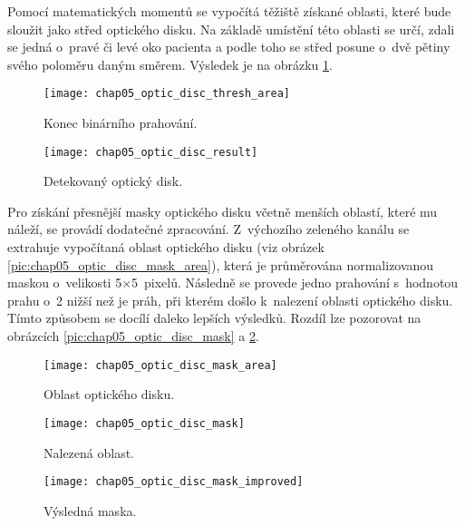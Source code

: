 Pomocí matematických momentů se vypočítá těžiště získané oblasti, které bude sloužit jako střed optického disku. Na základě umístění této oblasti se určí, zdali se jedná o~pravé či levé oko pacienta a podle toho se střed posune o~dvě pětiny svého poloměru daným směrem. Výsledek je na obrázku \ref{pic:chap05_optic_disc_result}.

\begin{figure}[h]
  \begin{minipage}[c]{0.47\textwidth}
    \texttt{[image: chap05\_optic\_disc\_thresh\_area]}
    \caption{Konec binárního prahování.}
    \label{pic:chap05_optic_disc_thresh_area}
  \end{minipage}
    \hfill
  \begin{minipage}[c]{0.47\textwidth}
    \texttt{[image: chap05\_optic\_disc\_result]}
    \caption{Detekovaný optický disk.}
    \label{pic:chap05_optic_disc_result}
  \end{minipage}
\end{figure}

Pro získání přesnější masky optického disku včetně menších oblastí, které mu náleží, se provádí dodatečné zpracování. Z~výchozího zeleného kanálu se extrahuje vypočítaná oblast optického disku (viz obrázek \ref{pic:chap05_optic_disc_mask_area}), která je průměrována normalizovanou maskou o~velikosti 5$\times$5~pixelů. Následně se provede jedno prahování s~hodnotou prahu o~2 nižší než je práh, při kterém došlo k~nalezení oblasti optického disku. Tímto způsobem se docílí daleko lepších výsledků. Rozdíl lze pozorovat na obrázcích \ref{pic:chap05_optic_disc_mask} a \ref{pic:chap05_optic_disc_mask_improved}.

\begin{figure}[h]
  \begin{minipage}[c]{0.315\textwidth}
    \texttt{[image: chap05\_optic\_disc\_mask\_area]}
    \caption{Oblast optického disku.}
    \label{pic:chap05_optic_disc_mask_area}
  \end{minipage}
  \hfill
  \begin{minipage}[c]{0.315\textwidth}
    \texttt{[image: chap05\_optic\_disc\_mask]}
    \caption{Nalezená oblast.}
    \label{pic:chap05_optic_disc_mask}
  \end{minipage}
    \hfill
  \begin{minipage}[c]{0.315\textwidth}
    \texttt{[image: chap05\_optic\_disc\_mask\_improved]}
    \caption{Výsledná maska.}
    \label{pic:chap05_optic_disc_mask_improved}
  \end{minipage}
\end{figure}


